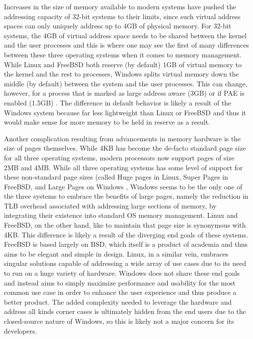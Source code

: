 \documentclass[onecolumn, draftclsnofoot,10pt, compsoc]{IEEEtran}
\begin{document}
Increases in the size of memory available to modern systems have pushed the addressing capacity of 32-bit systems to their limits, since such virtual address spaces can only uniquely address up to 4GB of physical memory. For 32-bit systems, the 4GB of virtual address space needs to be shared between the kernel and the user processes and this is where one may see the first of many differences between these three operating systems when it comes to memory management. While Linux and FreeBSD both reserve (by default) 1GB of virtual memory to the kernel and the rest to processes, Windows splits virtual memory down the middle (by default) between the system and the user processes. This can change, however, for a process that is marked as large address aware (3GB) or if PAE is enabled (1.5GB) \cite{WindowsInternals2}. The difference in default behavior is likely a result of the Windows system because far less lightweight than Linux or FreeBSD and thus it would make sense for more memory to be held in reserve as a result. 

Another complication resulting from advancements in memory hardware is the size of pages themselves. While 4KB has become the de-facto standard page size for all three operating systems, modern processors now support pages of size 2MB and 4MB. While all three operating systems has some level of support for these non-standard page sizes (called Huge pages in Linux, Super Pages in FreeBSD, and Large Pages on Windows \cite{Hugepages}, Windows seems to be the only one of the three systems to embrace the benefits of large pages, namely the reduction in TLB overhead associated with addressing large sections of memory, by integrating their existence into standard OS memory management. Linux and FreeBSD, on the other hand, like to maintain that page size is synonymous with 4KB. This difference is likely a result of the diverging end goals of these systems. FreeBSD is based largely on BSD, which itself is a product of academia and thus aims to be elegant and simple in design. Linux, in a similar vein, embraces singular solutions capable of addressing a wide array of use cases due to its need to run on a huge variety of hardware. Windows does not share these end goals and instead aims to simply maximize performance and usability for the most common use case in order to enhance the user experience and thus produce a better product. The added complexity needed to leverage the hardware and address all kinds corner cases is ultimately hidden from the end users due to the closed-source nature of Windows, so this is likely not a major concern for its developers.
\end{document}
